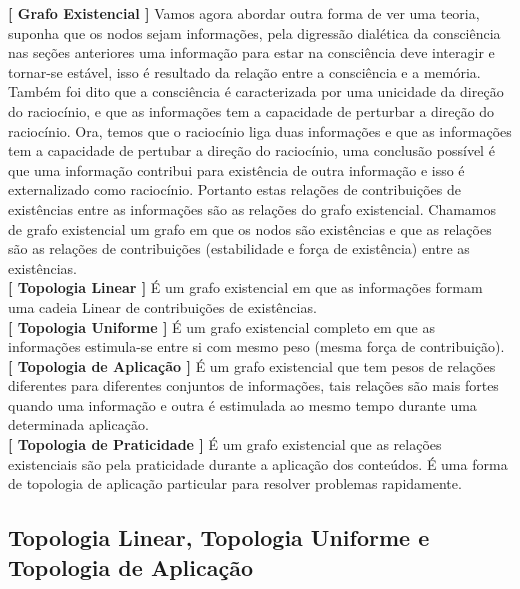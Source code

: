 \documentclass[10pt,a4paper]{report}
\begin{document}
\textbf{[ Grafo Existencial ]} Vamos agora abordar outra forma de ver uma teoria, suponha que os nodos sejam informações, pela digressão dialética da consciência nas seções anteriores uma informação para estar na consciência deve interagir e tornar-se estável, isso é resultado da relação entre a consciência e a memória. Também foi dito que a consciência é caracterizada por uma unicidade da direção do raciocínio, e que as informações tem a capacidade de perturbar a direção do raciocínio. Ora, temos que o raciocínio liga duas informações e que as informações tem a capacidade de pertubar a direção do raciocínio, uma conclusão possível é que uma informação contribui para existência de outra informação e isso é externalizado como raciocínio. Portanto estas relações de contribuições de existências entre as informações são as relações do grafo existencial. Chamamos de grafo existencial um grafo em que os nodos são existências e que as relações são as relações de contribuições (estabilidade e força de existência) entre as existências.\\

\textbf{[ Topologia Linear ]} É um grafo existencial em que as informações formam uma cadeia Linear de contribuições de existências.\\

\textbf{[ Topologia Uniforme ]} É um grafo existencial completo em que as informações estimula-se entre si com mesmo peso (mesma força de contribuição).\\

\textbf{[ Topologia de Aplicação ]} É um grafo existencial que tem pesos de relações diferentes para diferentes conjuntos de informações, tais relações são mais fortes quando uma informação e outra é estimulada ao mesmo tempo durante uma determinada aplicação. \\

\textbf{[ Topologia de Praticidade ]} É um grafo existencial que as relações existenciais são pela praticidade durante a aplicação dos conteúdos. É uma forma de topologia de aplicação particular para resolver problemas rapidamente.\\

\subsection{Topologia Linear, Topologia Uniforme e Topologia de Aplicação}

\hspace{\baselineskip}
\end{document}

